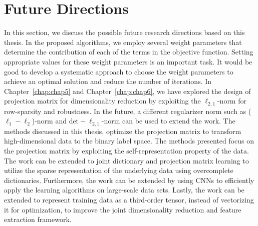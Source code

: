 \section{Future Directions}
\label{sec: Future_work}
%
In this section, we discuss the possible future research directions based on this thesis. In the proposed algorithms, we employ several weight parameters that determine the contribution of each of the terms in the objective function. Setting appropriate values for these weight parameters is an important task. It would be good to develop a systematic approach to choose the weight parameters to achieve an optimal solution and reduce the number of iterations. In Chapter~\ref{chap:chap5} and Chapter~\ref{chap:chap6}, we have explored the design of projection matrix for dimensionality reduction by exploiting the $\ell_{2,1}$-norm for row-sparsity and robustness. In the future, a different regularizer norm such as ($\ell_{1} - \ell_{2}$)-norm and $\text{det}-\ell_{2,1}$-norm can be used to extend the work. The methods discussed in this thesis, optimize the projection matrix to transform high-dimensional data to the binary label space. The methods presented focus on the projection matrix by exploiting the self-representation property of the data. The work can be extended to joint dictionary and projection matrix learning to utilize the sparse representation of the underlying data using overcomplete dictionaries. Furthermore, the work can be extended by using CNNs to efficiently apply the learning algorithms on large-scale data sets. Lastly, the work can be extended to represent training data as a third-order tensor, instead of vectorizing it for optimization, to improve the joint dimensionality reduction and feature extraction framework.